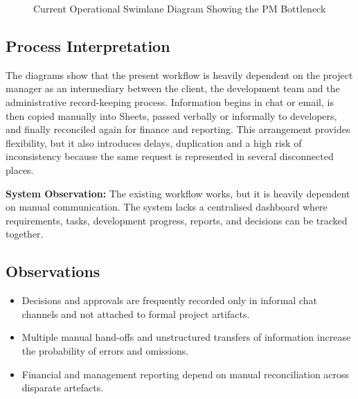 \documentclass[12pt,a4paper]{report}
\begin{document}
\begin{figure}[H]
{
}
\caption{Current Operational Swimlane Diagram Showing the PM Bottleneck}
\end{figure}

\subsection{Process Interpretation}
The diagrams show that the present workflow is heavily dependent on the project manager as an intermediary between the client, the development team and the administrative record-keeping process. Information begins in chat or email, is then copied manually into Sheets, passed verbally or informally to developers, and finally reconciled again for finance and reporting. This arrangement provides flexibility, but it also introduces delays, duplication and a high risk of inconsistency because the same request is represented in several disconnected places.

\begin{highlightBox}
\textbf{System Observation:} The existing workflow works, but it is heavily dependent on manual communication. The system lacks a centralised dashboard where requirements, tasks, development progress, reports, and decisions can be tracked together.
\end{highlightBox}

\subsection*{Observations}
\begin{itemize}[leftmargin=2em]
    \item Decisions and approvals are frequently recorded only in informal chat channels and not attached to formal project artifacts.
    \item Multiple manual hand-offs and unstructured transfers of information increase the probability of errors and omissions.
    \item Financial and management reporting depend on manual reconciliation across disparate artefacts.
\end{itemize}
\end{document}
